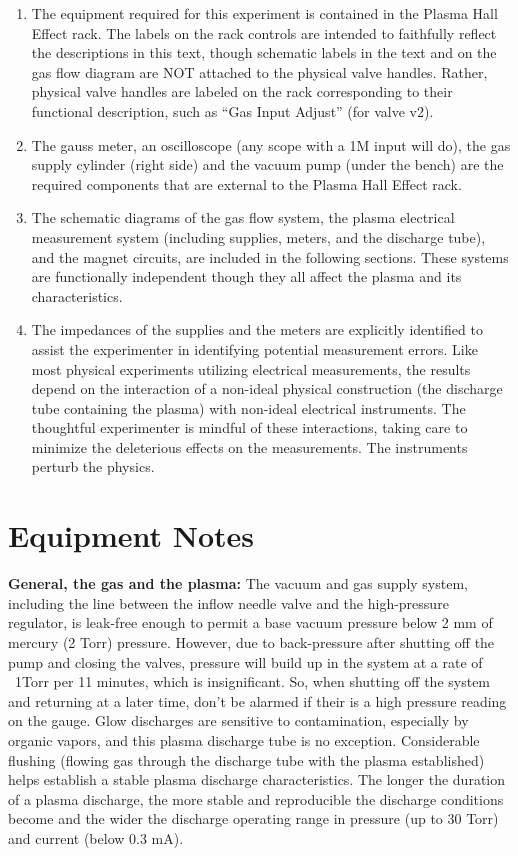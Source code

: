\documentclass{../lab}
\begin{document}
\begin{enumerate}
    \item The equipment required for this experiment is contained in the Plasma Hall Effect rack. The labels on the rack controls are intended to faithfully reflect the descriptions in this text, though schematic labels in the text and on the gas flow diagram are NOT attached to the physical valve handles. Rather, physical valve handles are labeled on the rack corresponding to their functional description, such as ``Gas Input Adjust'' (for valve v2).
    \item The gauss meter, an oscilloscope (any scope with a 1M input will do), the gas supply cylinder (right side) and the vacuum pump (under the bench) are the required components that are external to the Plasma Hall Effect rack.
    \item The schematic diagrams of the gas flow system, the plasma electrical measurement system (including supplies, meters, and the discharge tube), and the magnet circuits, are included in the following sections. These systems are functionally independent though they all affect the plasma and its characteristics.
    \item The impedances of the supplies and the meters are explicitly identified to assist the experimenter in identifying potential measurement errors. Like most physical experiments utilizing electrical measurements, the results depend on the interaction of a non-ideal physical construction (the discharge tube containing the plasma) with non-ideal electrical instruments. The thoughtful experimenter is mindful of these interactions, taking care to minimize the deleterious effects on the measurements. The instruments perturb the physics.
\end{enumerate}

\section{Equipment Notes}

\textbf{General, the gas and the plasma:} The vacuum and gas supply system, including the line between the inflow needle valve and the high-pressure regulator, is leak-free enough to permit a base vacuum pressure below 2 mm of mercury (2 Torr) pressure. However, due to back-pressure after shutting off the pump and closing the valves, pressure will build up in the system at a rate of ~1Torr per 11 minutes, which is insignificant. So, when shutting off the system and returning at a later time, don't be alarmed if their is a high pressure reading on the gauge. Glow discharges are sensitive to contamination, especially by organic vapors, and this plasma discharge tube is no exception. Considerable flushing (flowing gas through the discharge tube with the plasma established) helps establish a stable plasma discharge characteristics. The longer the duration of a plasma discharge, the more stable and reproducible the discharge conditions become and the wider the discharge operating range in pressure (up to 30 Torr) and current (below 0.3 mA).
\end{document}
